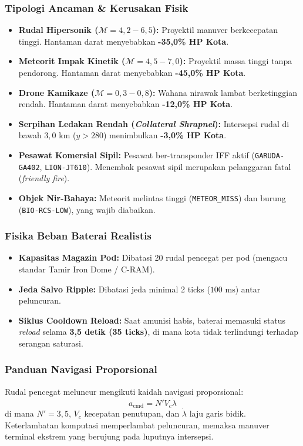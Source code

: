\documentclass[journal,compsoc]{IEEEtran}
\begin{document}
\subsubsection{Tipologi Ancaman \& Kerusakan Fisik}
\begin{itemize}
    \item \textbf{Rudal Hipersonik ($\mathcal{M} = 4,2 - 6,5$):} Proyektil manuver berkecepatan tinggi. Hantaman darat menyebabkan \textbf{-35,0\% HP Kota}.
    \item \textbf{Meteorit Impak Kinetik ($\mathcal{M} = 4,5 - 7,0$):} Proyektil massa tinggi tanpa pendorong. Hantaman darat menyebabkan \textbf{-45,0\% HP Kota}.
    \item \textbf{Drone Kamikaze ($\mathcal{M} = 0,3 - 0,8$):} Wahana nirawak lambat berketinggian rendah. Hantaman darat menyebabkan \textbf{-12,0\% HP Kota}.
    \item \textbf{Serpihan Ledakan Rendah (\textit{Collateral Shrapnel}):} Intersepsi rudal di bawah $3,0 \text{ km}$ ($y > 280$) menimbulkan \textbf{-3,0\% HP Kota}.
    \item \textbf{Pesawat Komersial Sipil:} Pesawat ber-transponder IFF aktif (\texttt{GARUDA-GA402}, \texttt{LION-JT610}). Menembak pesawat sipil merupakan pelanggaran fatal (\textit{friendly fire}).
    \item \textbf{Objek Nir-Bahaya:} Meteorit melintas tinggi (\texttt{METEOR\_MISS}) dan burung (\texttt{BIO-RCS-LOW}), yang wajib diabaikan.
\end{itemize}

\subsubsection{Fisika Beban Baterai Realistis}
\begin{itemize}
    \item \textbf{Kapasitas Magazin Pod:} Dibatasi 20 rudal pencegat per pod (mengacu standar Tamir Iron Dome / C-RAM).
    \item \textbf{Jeda Salvo Ripple:} Dibatasi jeda minimal 2 ticks ($100 \text{ ms}$) antar peluncuran.
    \item \textbf{Siklus Cooldown Reload:} Saat amunisi habis, baterai memasuki status \textit{reload} selama \textbf{3,5 detik (35 ticks)}, di mana kota tidak terlindungi terhadap serangan saturasi.
\end{itemize}

\subsubsection{Panduan Navigasi Proporsional}
Rudal pencegat meluncur mengikuti kaidah navigasi proporsional:
\begin{equation}
a_{\text{cmd}} = N' V_c \dot{\lambda}
\end{equation}
di mana $N'=3,5$, $V_c$ kecepatan penutupan, dan $\dot{\lambda}$ laju garis bidik. Keterlambatan komputasi memperlambat peluncuran, memaksa manuver terminal ekstrem yang berujung pada luputnya intersepsi.
\end{document}
